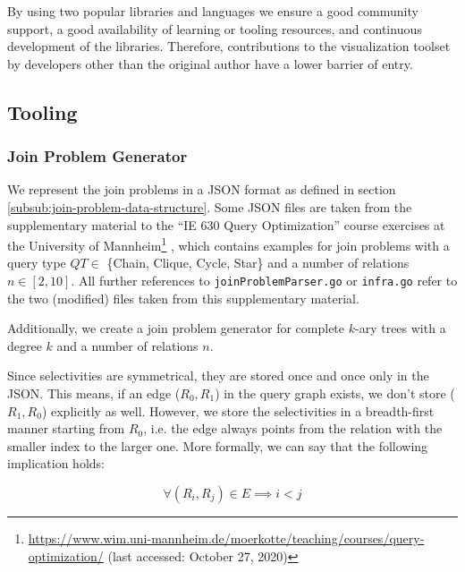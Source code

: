 By using two popular libraries and languages we ensure a good community support, a good availability of learning or tooling resources, and continuous development of the libraries. Therefore, contributions to the visualization toolset by developers other than the original author have a lower barrier of entry.


\subsection{Tooling}

\subsubsection{Join Problem Generator}
We represent the join problems in a JSON format as defined in section \ref{subsub:join-problem-data-structure}. 
Some JSON files are taken from the supplementary material to the ``IE 630 Query Optimization'' course exercises at the University of Mannheim\footnote{\url{https://www.wim.uni-mannheim.de/moerkotte/teaching/courses/query-optimization/} (last accessed: October 27, 2020)}
, which contains examples for join problems with a query type $QT \in $ \{Chain, Clique, Cycle, Star\} and a number of relations $n \in [2,10]$. All further references to \texttt{joinProblemParser.go} or \texttt{infra.go} refer to the two (modified) files taken from this supplementary material.

Additionally, we create a join problem generator for complete $k$-ary trees with a degree $k$ and a number of relations $n$.

Since selectivities are symmetrical, they are stored once and once only in the JSON. This means, if an edge ($R_0, R_1$) in the query graph exists, we don't store ($R_1, R_0$) explicitly as well. However, we store the selectivities in a breadth-first manner starting from $R_0$, i.e. the edge always points from the relation with the smaller index to the larger one. More formally, we can say that the following implication holds:

\begin{equation}
    \forall (R_i, R_j) \in E \implies i < j
\label{eq:bfs-implication}
\end{equation}

\setlength{\belowdisplayskip}{10pt}
\setlength{\belowdisplayshortskip}{50pt}
\setlength{\abovedisplayskip}{10pt}
\setlength{\abovedisplayshortskip}{10pt}

